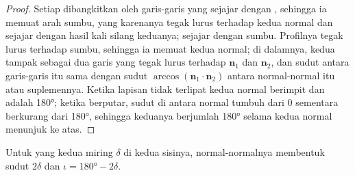 \begin{proof}
Setiap  dibangkitkan oleh garis-garis yang sejajar dengan , sehingga ia memuat arah sumbu, yang karenanya tegak lurus terhadap kedua normal dan sejajar dengan hasil kali silang keduanya;  sejajar dengan sumbu. Profilnya tegak lurus terhadap sumbu, sehingga ia memuat kedua normal; di dalamnya, kedua  tampak sebagai dua garis yang tegak lurus terhadap $\mathbf n_1$ dan $\mathbf n_2$, dan sudut antara garis-garis itu sama dengan sudut $\arccos(\mathbf n_1\cdot\mathbf n_2)$ antara normal-normal itu atau suplemennya. Ketika lapisan tidak terlipat kedua normal berimpit dan  adalah \ang{180}; ketika  berputar, sudut di antara normal tumbuh dari $0$ sementara  berkurang dari \ang{180}, sehingga keduanya berjumlah \ang{180} selama kedua normal menunjuk ke atas.
\end{proof}

Untuk  yang kedua  miring $\delta$ di kedua sisinya, normal-normalnya membentuk sudut $2\delta$ dan $\iota = \ang{180} - 2\delta$.

